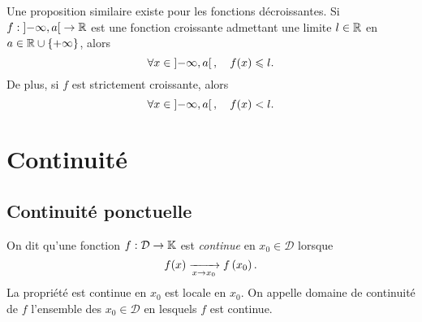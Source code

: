\documentclass{magnolia}
\begin{document}
\begin{remarques}
\remarque Une proposition similaire existe pour les fonctions décroissantes.
\remarque Si $f:\left]-\infty,a\right[\to\mathbb{R}$ est une fonction croissante admettant une limite $l\in\mathbb{R}$ en $a\in\mathbb{R}\cup\left\{+\infty\right\}$, alors
  \[\forall x\in\left]-\infty,a\right[ ,\quad f(x)\leqslant l.\]
  De plus, si $f$ est strictement croissante, alors
  \[\forall x\in\left]-\infty,a\right[ ,\quad f(x)< l.\]
\end{remarques}

\section{Continuité}

\subsection{Continuité ponctuelle}

\begin{definition}[utile=-3]
On dit qu'une fonction $f:\mathcal{D}\to\mathbb{K}$ est \emph{continue} en $x_0\in\mathcal{D}$ lorsque
\[f(x)\xrightarrow[x\rightarrow x_0]{} f\left(x_0\right).\]
La propriété \og est continue en $x_0$ \fg est locale en $x_0$. On appelle
domaine de continuité de $f$ l'ensemble des $x_0\in\mathcal{D}$ en lesquels
$f$ est continue.
\end{definition}
\end{document}
